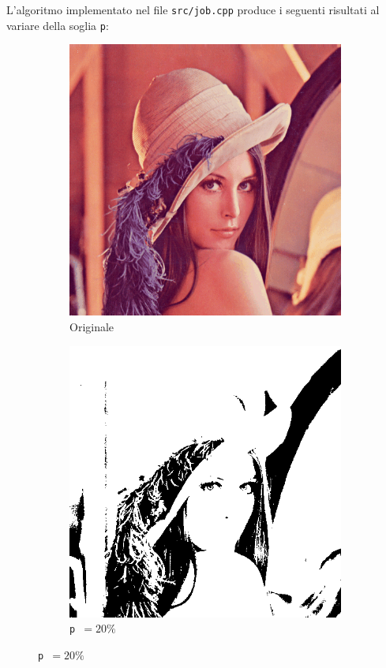 \documentclass[12pt]{article}
\begin{document}
    L'algoritmo implementato nel file \texttt{src/job.cpp} produce i
    seguenti risultati al variare della soglia \texttt{p}:

    \begin{figure}[H]
      \centering
      \begin{subfigure}[b]{0.33\textwidth}
        \centering
        \includegraphics[width=\textwidth]{lena.png}
        \caption*{Originale}
      \end{subfigure}
      \hspace{0.15\textwidth}
      \begin{subfigure}[b]{0.33\textwidth}
        \centering
        \includegraphics[width=\textwidth]{img/lena-threshold-20.png}
        \caption*{\texttt{p }\( = 20\%\)}
      \end{subfigure}


\end{figure}
\end{document}
